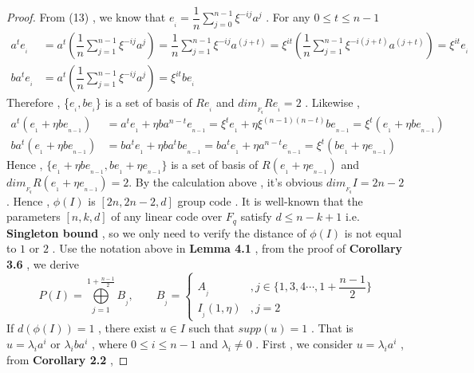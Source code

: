 \documentclass{article}
\begin{document}
\begin{proof}
    From (13) , we know that $e_{_i}=\dfrac{1}{n}\sum\limits_{j=0}^{n-1}\xi^{\scriptscriptstyle-ij}a^{j}$ . For any $0\leq t\leq n-1$
    \begin{align*}
        a^{\scriptscriptstyle t}e_{_i}&=a^{\scriptscriptstyle t}(\dfrac{1}{n}\sum\limits_{j=1}^{n-1}\xi^{\scriptscriptstyle-ij}a^{j})=
        \dfrac{1}{n}\sum\limits_{j=1}^{n-1}\xi^{\scriptscriptstyle-ij}a^{\scriptscriptstyle(j+t)}=\xi^{\scriptscriptstyle it}(\dfrac{1}{n}\sum\limits_{j=1}^{n-1}\xi^{\scriptscriptstyle-i(j+t)}a^{\scriptscriptstyle(j+t)})=\xi^{\scriptscriptstyle it}e_{_i}\\
        ba^{\scriptscriptstyle t}e_{_i}&=a^{\scriptscriptstyle t}(\dfrac{1}{n}\sum\limits_{j=1}^{n-1}\xi^{\scriptscriptstyle-ij}a^{j})=\xi^{\scriptscriptstyle it}be_{_i}
    \end{align*}
Therefore , \{$e_{_i},be_{_i}$\} is a set of basis of $Re_{_i}$ and $dim_{_{F_q}}Re_{_i}=2$ . Likewise , 
\begin{align*}
    a^{\scriptscriptstyle t}(e_{_1}+\eta be_{_{n-1}})&=a^{\scriptscriptstyle t}e_{_1}+\eta ba^{\scriptscriptstyle n-t}e_{_{n-1}}=\xi^{\scriptscriptstyle t}e_{_1}+\eta\xi^{\scriptscriptstyle (n-1)(n-t)}be_{_{n-1}}=\xi^{\scriptscriptstyle t}(e_{_1}+\eta be_{_{n-1}})\\
    ba^{\scriptscriptstyle t}(e_{_1}+\eta be_{_{n-1}})&=ba^{\scriptscriptstyle t}e_{_1}+\eta ba^{\scriptscriptstyle t}be_{_{n-1}}=ba^{\scriptscriptstyle t}e_{_1}+\eta a^{\scriptscriptstyle n-t}e_{_{n-1}}=\xi^{\scriptscriptstyle t}(be_{_1}+\eta e_{_{n-1}})
\end{align*}
Hence , $\{e_{_1}+\eta be_{_{n-1}},be_{_1}+\eta e_{_{n-1}}\}$ is a set of basis of $R(e_{_1}+\eta e_{_{n-1}})$ and $dim_{_{F_q}}R(e_{_1}+\eta e_{_{n-1}})=2$. By the calculation above , it's obvious $dim_{_{F_q}}I=2n-2$ . Hence , $\phi(I)$ is $[2n,2n-2,d]$ group code . It is well-known that the parameters $[n,k,d]$ of any linear code over $F_q$ satisfy $d\leq n-k+1$ i.e. \textbf{Singleton bound} , so we only need to verify the distance of $\phi(I)$ is not equal to $1$ or $2$ .  Use the notation above in \textbf{Lemma 4.1} , from the proof of \textbf{Corollary 3.6} , we derive
\[
P(I)=\bigoplus\limits_{j=1}^{1+\frac{n-1}{2}}B_{_j},\qquad 
    B_{_j}=\begin{cases}
    A_{_j}&,j\in{\{1,3,4\cdots,1+\dfrac{n-1}{2}\}}\\
    I_{_j}(1,\eta)&,j=2
\end{cases}
\]
If $d(\phi(I))=1$ , there exist $u\in{I}$ such that $supp(u)=1$ . That is $u=\lambda_i a^{\scriptscriptstyle i}\text{ or }\lambda_i ba^{\scriptscriptstyle i}$ , where $0\leq i\leq n-1$ and $\lambda_i\neq0$ . First , we consider $u=\lambda_i a^{\scriptscriptstyle i}$ , from \textbf{Corollary 2.2} ,

\end{proof}
\end{document}
